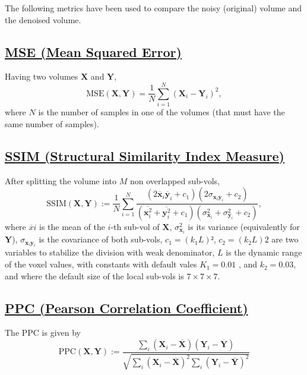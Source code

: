 \documentclass{article}
\begin{document}
The following metrics have been used to compare the noisy (original)
volume and the denoised volume.

\subsection{\href{https://en.wikipedia.org/wiki/Mean_squared_error}{MSE (Mean
    Squared Error)}}

Having two volumes $\mathbf{X}$ and $\mathbf{Y}$,
\begin{equation}
  \text{MSE}(\mathbf{X},\mathbf{Y}) = \frac{1}{N}\sum_{i=1}^N(\mathbf{X}_i - \mathbf{Y}_i)^2,
\end{equation}
where $N$ is the number of samples in one of the volumes (that must
have the same number of samples).

\subsection{\href{https://en.wikipedia.org/wiki/Structural_similarity_index_measure}{SSIM
    (Structural Similarity Index Measure)}}

After splitting the volume into $M$ non overlapped sub-vols,
\begin{equation}
  \text{SSIM}(\mathbf{X}, \mathbf{Y}) := \frac{1}{N} \sum_{i=1}^N \frac{(2\overline{\mathbf{x}}_i \overline{\mathbf{y}}_i + c_1)(2\sigma_{\mathbf{x}_i \mathbf{y}_i} + c_2)}{(\overline{\mathbf{x}_i^2} + \overline{\mathbf{y}_i^2} + c_1)(\sigma^2_{\mathbf{x}_i} + \sigma^2_{\mathbf{y}_i} + c_2)},
\end{equation}
where $\overline{x}i$ is the mean of the $i$-th sub-vol of
$\mathbf{X}$, $\sigma^2_{\mathbf{x}_i}$ is its variance (equivalently
for $\mathbf{Y}$), $\sigma_{\mathbf{x}_i\mathbf{y}_i}$ is the
covariance of both sub-vols, $c_1=(k_1L) ²$, $c_2=(k_2L) 2$ are two
variables to stabilize the division with weak denominator, $L$ is the
dynamic range of the voxel values, with constants with default vales
$K_1=0.01$ , and $k_2=0.03$, and where the default size of the local
sub-vols is $7\times 7\times 7$.

\subsection{\href{https://en.wikipedia.org/wiki/Pearson_correlation_coefficient}{PPC
    (Pearson Correlation Coefficient)}}
The PPC is given by
\begin{equation}
  \text{PPC}(\mathbf{X}, \mathbf{Y}) := \frac{\sum_i(\mathbf{X}_i - \overline{\mathbf{X}})(\mathbf{Y}_i - \overline{\mathbf{Y}})}{\sqrt{\sum_i (\mathbf{X}_i - \overline{\mathbf{X}})^2 \sum_i (\mathbf{Y}_i - \overline{\mathbf{Y}})^2}}
\end{equation}
\end{document}
